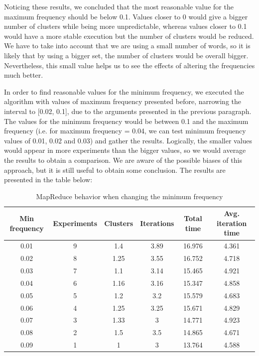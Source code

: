 Noticing these results, we concluded that the most reasonable value for the maximum frequency should be below 0.1. Values closer to 0 would give a bigger number of clusters while being more unpredictable, whereas values closer to 0.1 would have a more stable execution but the number of clusters would be reduced. We have to take into account that we are using a small number of words, so it is likely that by using a bigger set, the number of clusters would be overall bigger. Nevertheless, this small value helps us to see the effects of altering the frequencies much better.

In order to find reasonable values for the minimum frequency, we executed the algorithm with values of maximum frequency presented before, narrowing the interval to [0.02, 0.1], due to the arguments presented in the previous paragraph. The values for the minimum frequency would be between 0.1 and the maximum frequency (i.e. for maximum frequency = 0.04, we can test minimum frequency values of 0.01, 0.02 and 0.03) and gather the results. Logically, the smaller values would appear in more experiments than the bigger values, so we would average the results to obtain a comparison. We are aware of the possible biases of this approach, but it is still useful to obtain some conclusion. The results are presented in the table below:

\begin{table}[h!]
\begin{tabular}{||c c c c c c||}
 \hline
 Min frequency & Experiments & Clusters & Iterations & Total time & Avg. iteration time \\ [0.5ex]
 \hline\hline
 0.01 & 9 & 1.4 & 3.89 & 16.976 & 4.361 \\
 \hline
 0.02 & 8 & 1.25 & 3.55 & 16.752 & 4.718 \\
 \hline
 0.03 & 7 & 1.1 & 3.14 & 15.465 & 4.921 \\
 \hline
 0.04 & 6 & 1.16 & 3.16 & 15.347 & 4.858 \\
 \hline
 0.05 & 5 & 1.2 & 3.2 & 15.579 & 4.683 \\
 \hline
 0.06 & 4 & 1.25 & 3.25 & 15.671 & 4.829\\
 \hline
 0.07 & 3 & 1.33 & 3 & 14.771 & 4.923\\
 \hline
 0.08 & 2 & 1.5 & 3.5 & 14.865 & 4.671 \\
 \hline
 0.09 & 1 & 1 & 3 & 13.764 & 4.588 \\
 \hline
\end{tabular}
\caption{MapReduce behavior when changing the minimum frequency}
\end{table}

